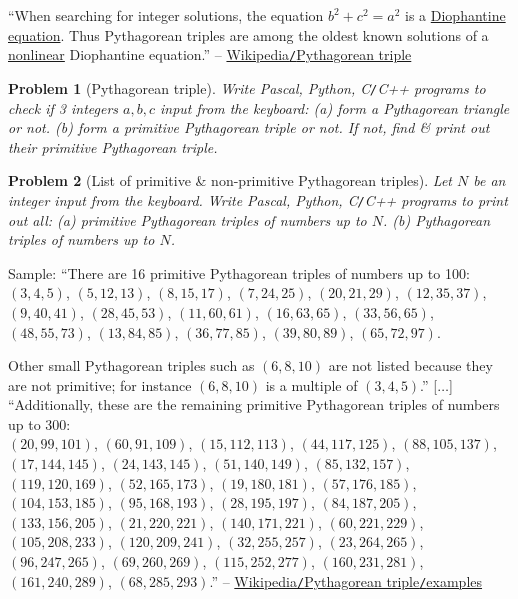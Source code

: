\documentclass{article}
\newtheorem{problem}{Problem}
\begin{document}
``When searching for integer solutions, the equation $b^2 + c^2 = a^2$ is a \href{https://en.wikipedia.org/wiki/Diophantine_equation}{Diophantine equation}. Thus Pythagorean triples are among the oldest known solutions of a \href{https://en.wikipedia.org/wiki/Linear_equation}{nonlinear} Diophantine equation.'' -- \href{https://en.wikipedia.org/wiki/Pythagorean_triple}{Wikipedia{\tt/}Pythagorean triple}

\begin{problem}[Pythagorean triple]
	 Write {\sf Pascal, Python, C{\tt/}C++} programs to check if 3 integers $a,b,c$ input from the keyboard: (a) form a Pythagorean triangle or not. (b) form a primitive Pythagorean triple or not. If not, find \& print out their primitive Pythagorean triple.
\end{problem}

\begin{problem}[List of primitive \& non-primitive Pythagorean triples]
	 Let $N$ be an integer input from the keyboard. Write {\sf Pascal, Python, C{\tt/}C++} programs to print out all: (a) primitive Pythagorean triples of numbers up to $N$. (b) Pythagorean triples of numbers up to $N$.
\end{problem}
Sample: ``There are 16 primitive Pythagorean triples of numbers up to 100:\\$(3, 4, 5)$, $(5, 12, 13)$, $(8, 15, 17)$, $(7, 24, 25)$, $(20, 21, 29)$, $(12, 35, 37)$, $(9, 40, 41)$, $(28, 45, 53)$, $(11, 60, 61)$, $(16, 63, 65)$, $(33, 56, 65)$, $(48, 55, 73)$, $(13, 84, 85)$, $(36, 77, 85)$, $(39, 80, 89)$, $(65, 72, 97)$.

Other small Pythagorean triples such as $(6, 8, 10)$ are not listed because they are not primitive; for instance $(6, 8, 10)$ is a multiple of $(3, 4, 5)$.'' [$\ldots$] ``Additionally, these are the remaining primitive Pythagorean triples of numbers up to 300:\\$(20, 99, 101)$, $(60, 91, 109)$, $(15, 112, 113)$, $(44, 117, 125)$, $(88, 105, 137)$, $(17, 144, 145)$, $(24, 143, 145)$, $(51, 140, 149)$, $(85, 132, 157)$, $(119, 120, 169)$, $(52, 165, 173)$, $(19, 180, 181)$, $(57, 176, 185)$, $(104, 153, 185)$, $(95, 168, 193)$, $(28, 195, 197)$, $(84, 187, 205)$, $(133, 156, 205)$, $(21, 220, 221)$, $(140, 171, 221)$, $(60, 221, 229)$, $(105, 208, 233)$, $(120, 209, 241) $, $(32, 255, 257)$, $(23, 264, 265)$, $(96, 247, 265)$, $(69, 260, 269)$, $(115, 252, 277)$, $(160, 231, 281)$, $(161, 240, 289)$, $(68, 285, 293)$.'' -- \href{https://en.wikipedia.org/wiki/Pythagorean_triple#Examples}{Wikipedia{\tt/}Pythagorean triple{\tt/}examples}
\end{document}
